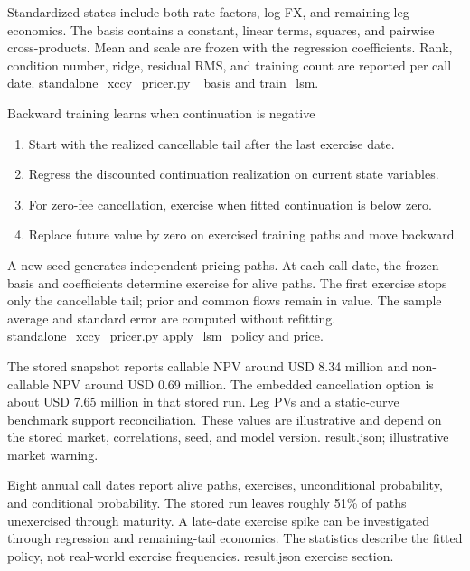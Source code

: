 {Standardized states include both rate factors, log FX, and remaining-leg economics.}
{The basis contains a constant, linear terms, squares, and pairwise cross-products.}
{Mean and scale are frozen with the regression coefficients.}
{Rank, condition number, ridge, residual RMS, and training count are reported per call date.}
{standalone\_xccy\_pricer.py \_basis and train\_lsm.}

\begin{frame}{Backward training learns when continuation is negative}
  \begin{enumerate}\setlength\itemsep{0.75em}
    \item Start with the realized cancellable tail after the last exercise date.
    \item Regress the discounted continuation realization on current state variables.
    \item For zero-fee cancellation, exercise when fitted continuation is below zero.
    \item Replace future value by zero on exercised training paths and move backward.
  \end{enumerate}
\end{frame}

{A new seed generates independent pricing paths.}
{At each call date, the frozen basis and coefficients determine exercise for alive paths.}
{The first exercise stops only the cancellable tail; prior and common flows remain in value.}
{The sample average and standard error are computed without refitting.}
{standalone\_xccy\_pricer.py apply\_lsm\_policy and price.}

{The stored snapshot reports callable NPV around USD 8.34 million and non-callable NPV around USD 0.69 million.}
{The embedded cancellation option is about USD 7.65 million in that stored run.}
{Leg PVs and a static-curve benchmark support reconciliation.}
{These values are illustrative and depend on the stored market, correlations, seed, and model version.}
{result.json; illustrative market warning.}

{Eight annual call dates report alive paths, exercises, unconditional probability, and conditional probability.}
{The stored run leaves roughly 51\% of paths unexercised through maturity.}
{A late-date exercise spike can be investigated through regression and remaining-tail economics.}
{The statistics describe the fitted policy, not real-world exercise frequencies.}
{result.json exercise section.}


